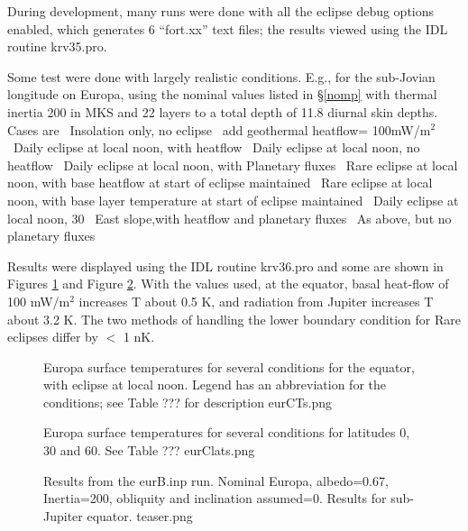 \documentclass{article}
\begin{document}
During development, many runs were done with all the eclipse debug options enabled, which generates 6 ``fort.xx'' text files; the results viewed  using the IDL routine krv35.pro.  

Some test were done with largely realistic conditions. E.g., for the sub-Jovian longitude on Europa, using the nominal values listed in \S \ref{nomp} with thermal inertia 200 in MKS and 22 layers to a total depth of 11.8 diurnal skin depths. Cases are 
 \ Insolation only, no eclipse
 \ add geothermal  heatflow= 100mW/m$^2$
 \ Daily eclipse at local noon, with heatflow  
 \ Daily eclipse at local noon, no heatflow   
 \ Daily eclipse at local noon, with Planetary fluxes
 \ Rare eclipse at local noon, with base heatflow at start of eclipse maintained
 \ Rare eclipse at local noon, with base layer temperature at start of eclipse maintained
 \ Daily eclipse at local noon, 30\qd~ East slope,with heatflow and planetary fluxes
 \ As above, but no planetary fluxes

Results were displayed using the IDL routine krv36.pro and some are shown in
Figures \ref{eurCTs} and Figure \ref{eurClats}.  With the values used, at the
equator, basal heat-flow of 100 mW/m$^2$ increases T about 0.5 K, and radiation
from Jupiter increases T about 3.2 K. The two methods of handling the lower
boundary condition for Rare eclipses differ by $<$ 1 nK.

\begin{figure}[!ht] 
\caption[Europa surface T]{Europa surface temperatures for several conditions
  for the equator, with eclipse at local noon. Legend has an abbreviation for
  the conditions; see Table ??? for description
\label{eurCTs} eurCTs.png }
\end{figure} 

\begin{figure}[!ht] 
\caption[Europa 3 latitudes]{Europa surface temperatures for several conditions for latitudes 0, 30 and 60. See Table ??? 
\label{eurClats}  eurClats.png }
\end{figure} 

\begin{figure}[!ht] 
\caption[Europa test]{Results from the eurB.inp run. Nominal Europa,
  albedo=0.67, Inertia=200, obliquity and inclination assumed=0. Results for
  sub-Jupiter equator.
\label{teaser}  teaser.png }
\end{figure} 
\end{document}
